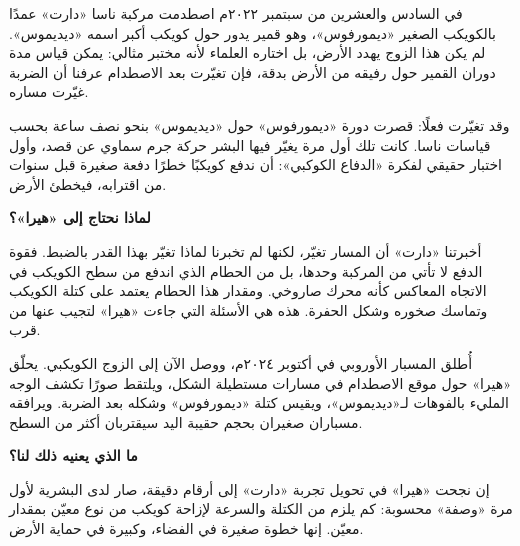 \documentclass[11pt]{article}
\begin{document}
\newpage


في السادس والعشرين من سبتمبر ٢٠٢٢م اصطدمت مركبة ناسا «دارت» عمدًا بالكويكب الصغير «ديمورفوس»، وهو قمير يدور حول كويكب أكبر اسمه «ديديموس». لم يكن هذا الزوج يهدد الأرض، بل اختاره العلماء لأنه مختبر مثالي: يمكن قياس مدة دوران القمير حول رفيقه من الأرض بدقة، فإن تغيّرت بعد الاصطدام عرفنا أن الضربة غيّرت مساره.

وقد تغيّرت فعلًا: قصرت دورة «ديمورفوس» حول «ديديموس» بنحو نصف ساعة بحسب قياسات ناسا. كانت تلك أول مرة يغيّر فيها البشر حركة جرم سماوي عن قصد، وأول اختبار حقيقي لفكرة «الدفاع الكوكبي»: أن ندفع كويكبًا خطرًا دفعة صغيرة قبل سنوات من اقترابه، فيخطئ الأرض.

\begin{feature}
{\sansfont\bfseries\color{gold} لماذا نحتاج إلى «هيرا»؟}\par
أخبرتنا «دارت» أن المسار تغيّر، لكنها لم تخبرنا لماذا تغيّر بهذا القدر بالضبط. فقوة الدفع لا تأتي من المركبة وحدها، بل من الحطام الذي اندفع من سطح الكويكب في الاتجاه المعاكس كأنه محرك صاروخي. ومقدار هذا الحطام يعتمد على كتلة الكويكب وتماسك صخوره وشكل الحفرة. هذه هي الأسئلة التي جاءت «هيرا» لتجيب عنها من قرب.
\end{feature}

أُطلق المسبار الأوروبي في أكتوبر ٢٠٢٤م، ووصل الآن إلى الزوج الكويكبي. يحلّق «هيرا» حول موقع الاصطدام في مسارات مستطيلة الشكل، ويلتقط صورًا تكشف الوجه المليء بالفوهات لـ«ديديموس»، ويقيس كتلة «ديمورفوس» وشكله بعد الضربة. ويرافقه مسباران صغيران بحجم حقيبة اليد سيقتربان أكثر من السطح.

{\sansfont\bfseries\color{blue} ما الذي يعنيه ذلك لنا؟}\par
إن نجحت «هيرا» في تحويل تجربة «دارت» إلى أرقام دقيقة، صار لدى البشرية لأول مرة «وصفة» محسوبة: كم يلزم من الكتلة والسرعة لإزاحة كويكب من نوع معيّن بمقدار معيّن. إنها خطوة صغيرة في الفضاء، وكبيرة في حماية الأرض.
\end{document}
